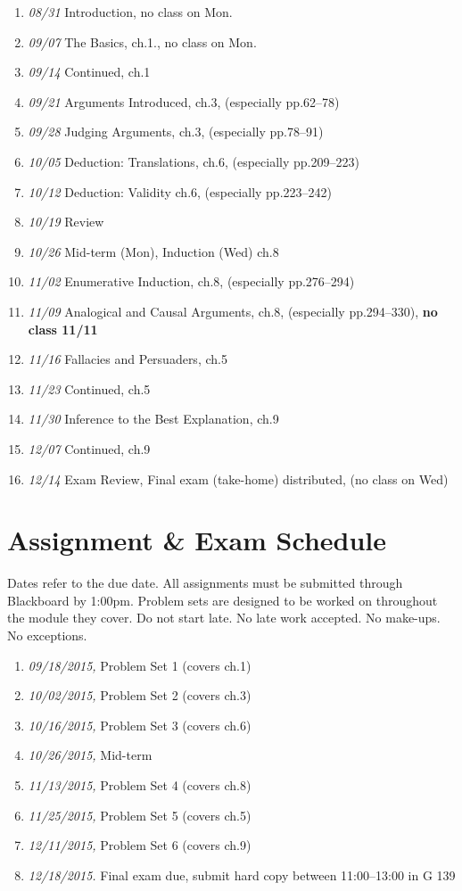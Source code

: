 \documentclass[article,oneside]{memoir}
\begin{document}
\begin{enumerate}
\item \textit{08/31} Introduction,  no class on Mon.
\item \textit{09/07} The Basics,  ch.1., no class on Mon.
\item \textit{09/14} Continued, ch.1 
\item \textit{09/21} Arguments Introduced, ch.3, (especially pp.62--78)
\item \textit{09/28} Judging Arguments, ch.3, (especially pp.78--91)
\item \textit{10/05} Deduction: Translations, ch.6, (especially pp.209--223)
\item \textit{10/12} Deduction: Validity ch.6, (especially pp.223--242)
\item \textit{10/19} Review
\item \textit{10/26} Mid-term (Mon), Induction (Wed) ch.8
\item \textit{11/02} Enumerative Induction, ch.8, (especially pp.276--294)
\item \textit{11/09} Analogical and Causal Arguments, ch.8, (especially pp.294--330), \textbf{no class 11/11}
\item \textit{11/16} Fallacies and Persuaders, ch.5
 \item \textit{11/23} Continued, ch.5
 \item \textit{11/30} Inference to the Best Explanation, ch.9
\item \textit{12/07} Continued,  ch.9
\item \textit{12/14} Exam Review, Final exam (take-home) distributed, (no class on Wed)
\end{enumerate}


\section{Assignment \& Exam Schedule}
Dates refer to the due date. All assignments must be submitted through Blackboard by 1:00pm. Problem sets are designed to be worked on throughout the module they cover. Do not start late. No late work accepted. No make-ups. No exceptions. 

\begin{enumerate}
\item \textit{09/18/2015,} Problem Set 1 (covers ch.1)
\item \textit{10/02/2015,} Problem Set 2 (covers ch.3)
\item \textit{10/16/2015,} Problem Set 3 (covers ch.6)
\item \textit{10/26/2015,} Mid-term 
\item \textit{11/13/2015,} Problem Set 4 (covers ch.8)
\item \textit{11/25/2015,} Problem Set 5 (covers ch.5)
\item \textit{12/11/2015,} Problem Set 6 (covers ch.9)
\item \textit{12/18/2015.} Final exam due, submit hard copy between 11:00--13:00 in G 139 
\end{enumerate}


\end{document}
